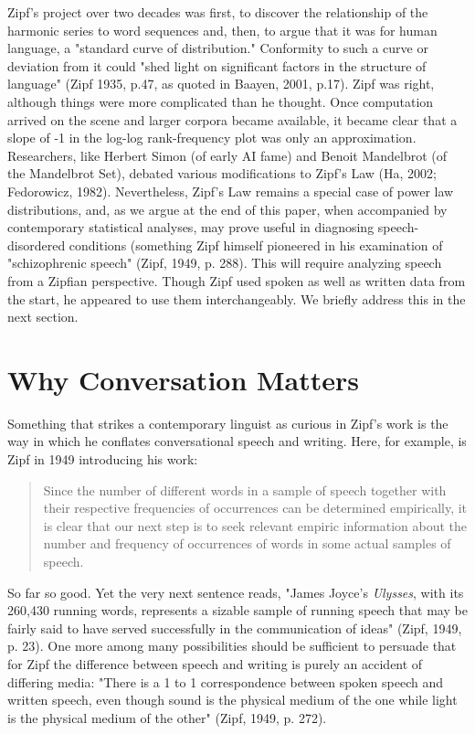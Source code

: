 \documentclass[12pt]{article}
\begin{document}
Zipf's project over two decades was first, to discover the relationship of the harmonic series to word sequences and, then, to argue that it was for human language, a "standard curve of distribution."  Conformity to such a curve or deviation from it could "shed light on significant factors in the structure of language" (Zipf 1935, p.47, as quoted in Baayen, 2001, p.17).  Zipf was right, although things were more complicated than he thought.   Once computation arrived on the scene and larger corpora became available, it became clear that a slope of -1 in the log-log rank-frequency plot was only an approximation.  Researchers, like Herbert Simon (of early AI fame) and Benoit Mandelbrot (of the Mandelbrot Set), debated various modifications to Zipf's Law (Ha, 2002; Fedorowicz, 1982).  Nevertheless, Zipf's Law remains a special case of power law distributions, and, as we argue at the end of this paper, when accompanied by contemporary statistical analyses, may prove useful in diagnosing speech-disordered conditions (something Zipf himself pioneered in his examination of  "schizophrenic speech" (Zipf, 1949, p. 288).  This will require analyzing speech from a Zipfian perspective.  Though Zipf used spoken as well as written data from the start, he appeared to use them interchangeably.  We briefly address this in the next section. 


\section{Why Conversation Matters}
Something that strikes a contemporary linguist as curious in Zipf's work is the way in which he conflates conversational speech and writing.  Here, for example, is Zipf in 1949 introducing his work:
\begin{quote}
Since the number of different words in a sample of speech together with their respective frequencies of occurrences can be determined empirically, it is clear that our next step is to seek relevant empiric information about the number and frequency of occurrences of words in some actual samples of speech.
\end{quote}
So far so good.  Yet the very next sentence reads, "James Joyce's \emph{Ulysses}, with its 260,430 running words, represents a sizable sample of running speech that may be fairly said to have served successfully in the communication of ideas" (Zipf, 1949, p. 23).  One more among many possibilities should be sufficient to persuade that for Zipf the difference between speech and writing is purely an accident of differing media: "There is a 1 to 1 correspondence between spoken speech and written speech, even though sound is the physical medium of the one while light is the physical medium of the other" (Zipf, 1949, p. 272).  
\end{document}
